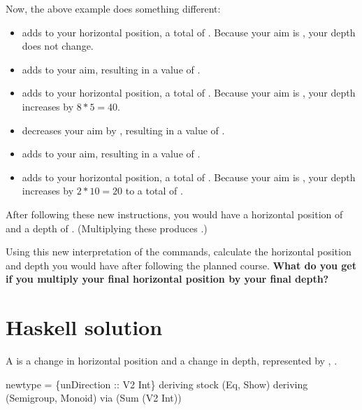 Now, the above example does something different:
\begin{itemize}
\item {\Tt{}\nwendquote} adds  to your horizontal position, a total of . Because your aim is , your depth does not change.
\item {\Tt{}\nwendquote} adds  to your aim, resulting in a value of .
\item {\Tt{}\nwendquote} adds  to your horizontal position, a total of . Because your aim is , your depth increases by $8*5=40$.
\item {\Tt{}\nwendquote} decreases your aim by , resulting in a value of .
\item {\Tt{}\nwendquote} adds  to your aim, resulting in a value of .
\item {\Tt{}\nwendquote} adds  to your horizontal position, a total of . Because your aim is , your depth increases by $2*10=20$ to a total of .
\end{itemize}

After following these new instructions, you would have a horizontal position of  and a depth of . (Multiplying these produces .)

Using this new interpretation of the commands, calculate the horizontal position and depth you would have after following the planned course. \textbf{What do you get if you multiply your final horizontal position by your final depth?}
\nwenddocs{}\newpage
\section{Haskell solution}

A {\Tt{}\nwendquote} is a change in horizontal position and a change in depth,
represented by , .

\nwenddocs{}\endmoddef\nwstartdeflinemarkup{}\nwenddeflinemarkup
newtype  =  \{unDirection :: V2 Int\}
  deriving stock (Eq, Show)
  deriving
    (Semigroup, Monoid)
    via (Sum (V2 Int))

